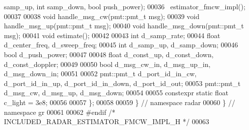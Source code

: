 \begin{DoxyCode}
      samp_up, \textcolor{keywordtype}{int} samp_down, \textcolor{keywordtype}{bool} push\_power);
00036       ~estimator_fmcw_impl();
00037       
00038       \textcolor{keywordtype}{void} handle_msg_cw(pmt::pmt\_t msg);
00039       \textcolor{keywordtype}{void} handle_msg_up(pmt::pmt\_t msg);
00040       \textcolor{keywordtype}{void} handle_msg_down(pmt::pmt\_t msg);
00041       \textcolor{keywordtype}{void} estimate();
00042       
00043       \textcolor{keywordtype}{int} d_samp_rate;
00044       \textcolor{keywordtype}{float} d_center_freq, d_sweep_freq;
00045       \textcolor{keywordtype}{int} d_samp_up, d_samp_down;
00046       \textcolor{keywordtype}{bool} d_push_power;
00047       
00048       \textcolor{keywordtype}{float} d_const_up, d_const_down, d_const_doppler;
00049       
00050       \textcolor{keywordtype}{bool} d_msg_cw_in, d_msg_up_in, d_msg_down_in;
00051       
00052       pmt::pmt\_t d_port_id_in_cw, d_port_id_in_up, d_port_id_in_down, 
      d_port_id_out;
00053       pmt::pmt\_t d_msg_cw, d_msg_up, d_msg_down;
00054       
00055       constexpr \textcolor{keyword}{static} \textcolor{keywordtype}{float} c_light = 3e8;
00056 
00057     \};
00058 
00059   \} \textcolor{comment}{// namespace radar}
00060 \} \textcolor{comment}{// namespace gr}
00061 
00062 \textcolor{preprocessor}{#endif }\textcolor{comment}{/* INCLUDED\_RADAR\_ESTIMATOR\_FMCW\_IMPL\_H */}\textcolor{preprocessor}{}
00063 
\end{DoxyCode}
